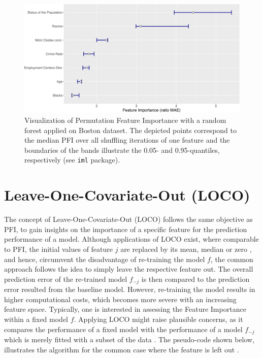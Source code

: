 \documentclass[
]{krantz}
\begin{document}
\begin{figure}
\centering
\includegraphics{book_files/figure-latex/plot-1.pdf}
\caption{\label{fig:plot}Visualization of Permutation Feature Importance with a random forest applied on Boston dataset. The depicted points correspond to the median PFI over all shuffling iterations of one feature and the boundaries of the bands illustrate the 0.05- and 0.95-quantiles, respectively (see \texttt{iml} package).}
\end{figure}

\hypertarget{leave-one-covariate-out-loco}{%
\section{Leave-One-Covariate-Out (LOCO)}\label{leave-one-covariate-out-loco}}

The concept of Leave-One-Covariate-Out (LOCO) follows the same objective as PFI, to gain insights on the importance of a specific feature for the prediction performance of a model. Although applications of LOCO exist, where comparable to PFI, the initial values of feature \(j\) are replaced by its mean, median or zero \citep[see][]{hall2017ideas}, and hence, circumvent the disadvantage of re-training the model \(f\), the common approach follows the idea to simply leave the respective feature out. The overall prediction error of the re-trained model \(f_{-j}\) is then compared to the prediction error resulted from the baseline model. However, re-training the model results in higher computational costs, which becomes more severe with an increasing feature space. Typically, one is interested in assessing the Feature Importance within a fixed model \(f\). Applying LOCO might raise plausible concerns, as it compares the performance of a fixed model with the performance of a model \(f_{-j}\) which is merely fitted with a subset of the data \citep[see][]{molnar2019}. The pseudo-code shown below, illustrates the algorithm for the common case where the feature is left out \citep[see][]{lei2018distribution}.
\end{document}

